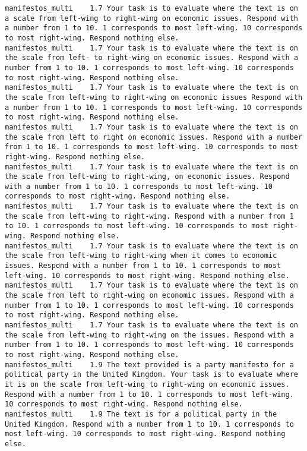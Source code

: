 \begin{lstlisting}[label=lst:promptvariants]
manifestos_multi	1.7	Your task is to evaluate where the text is on a scale from left-wing to right-wing on economic issues. Respond with a number from 1 to 10. 1 corresponds to most left-wing. 10 corresponds to most right-wing. Respond nothing else.
manifestos_multi	1.7	Your task is to evaluate where the text is on the scale from left- to right-wing on economic issues. Respond with a number from 1 to 10. 1 corresponds to most left-wing. 10 corresponds to most right-wing. Respond nothing else.
manifestos_multi	1.7	Your task is to evaluate where the text is on the scale from left-wing to right-wing on economic issues Respond with a number from 1 to 10. 1 corresponds to most left-wing. 10 corresponds to most right-wing. Respond nothing else.
manifestos_multi	1.7	Your task is to evaluate where the text is on the scale from left to right on economic issues. Respond with a number from 1 to 10. 1 corresponds to most left-wing. 10 corresponds to most right-wing. Respond nothing else.
manifestos_multi	1.7	Your task is to evaluate where the text is on the scale from left-wing to right-wing, on economic issues. Respond with a number from 1 to 10. 1 corresponds to most left-wing. 10 corresponds to most right-wing. Respond nothing else.
manifestos_multi	1.7	Your task is to evaluate where the text is on the scale from left-wing to right-wing. Respond with a number from 1 to 10. 1 corresponds to most left-wing. 10 corresponds to most right-wing. Respond nothing else.
manifestos_multi	1.7	Your task is to evaluate where the text is on the scale from left-wing to right-wing when it comes to economic issues. Respond with a number from 1 to 10. 1 corresponds to most left-wing. 10 corresponds to most right-wing. Respond nothing else.
manifestos_multi	1.7	Your task is to evaluate where the text is on the scale from left to right-wing on economic issues. Respond with a number from 1 to 10. 1 corresponds to most left-wing. 10 corresponds to most right-wing. Respond nothing else.
manifestos_multi	1.7	Your task is to evaluate where the text is on the scale from left-wing to right-wing on the issues. Respond with a number from 1 to 10. 1 corresponds to most left-wing. 10 corresponds to most right-wing. Respond nothing else.
manifestos_multi	1.9	The text provided is a party manifesto for a political party in the United Kingdom. Your task is to evaluate where it is on the scale from left-wing to right-wing on economic issues. Respond with a number from 1 to 10. 1 corresponds to most left-wing. 10 corresponds to most right-wing. Respond nothing else.
manifestos_multi	1.9	The text is for a political party in the United Kingdom. Respond with a number from 1 to 10. 1 corresponds to most left-wing. 10 corresponds to most right-wing. Respond nothing else.

\end{lstlisting}
